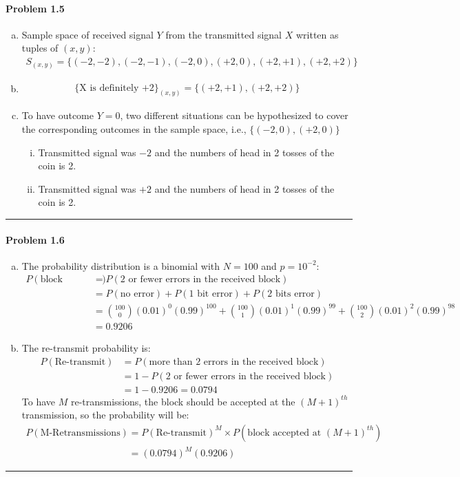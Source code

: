 \documentclass[12pt, letterpaper]{scrartcl}
\begin{document}
\paragraph*{Problem 1.5} \hfill
\begin{enumerate}[a.]
    \item Sample space of received signal $Y$ from the transmitted signal $X$ written as tuples of $(x,y)$:
    \begin{align*}
        S_{(x,y)}=\{(-2,-2), (-2,-1), (-2,0), (+2,0), (+2,+1), (+2,+2)\}
    \end{align*}
    \item 
    \begin{align*}
        \{\text{X is definitely +2} \}_{(x,y)}=\{(+2,+1), (+2,+2)\}
    \end{align*}
    \item
    To have outcome $Y=0$, two different situations can be hypothesized to cover the corresponding outcomes in the sample space, i.e., $\{(-2,0), (+2,0)\}$
    \begin{enumerate}[i.]
        \item Transmitted signal was $-2$ and the numbers of head in 2 tosses of the coin is 2. 
        \item Transmitted signal was $+2$ and the numbers of head in 2 tosses of the coin is 2.
    \end{enumerate} 
\end{enumerate}
\hrule

\paragraph*{Problem 1.6} \hfill
\begin{enumerate}[a.]
    \item The probability distribution is a binomial with $N=100$ and $p=10^{-2}$:
    \begin{align*}
        P(\text{block accepted})&=P(\text{2 or fewer errors in the received block})\\
        &=P(\text{no error})+P(\text{1 bit error})+P(\text{2 bits error})\\
        &= {100\choose0}(0.01)^0(0.99)^{100}+{100\choose1}(0.01)^1(0.99)^{99}+{100\choose2}(0.01)^2(0.99)^{98}\\
        &=0.9206
    \end{align*}
    \item The re-transmit probability is:
    \begin{align*}
        P(\text{Re-transmit})&=P(\text{more than 2 errors in the received block})\\
        &=1-P(\text{2 or fewer errors in the received block})\\
        &= 1-0.9206=0.0794
    \end{align*}
    To have $M$ re-transmissions, the block should be accepted at the $(M+1)^{th}$ transmission, so the probability will be:
    \begin{align*}
        P(\text{M-Retransmissions})&=P(\text{Re-transmit})^M\times P(\text{block accepted at }(M+1)^{th})\\
        &=(0.0794)^M(0.9206)
    \end{align*}
\end{enumerate}
\hrule
\end{document}
